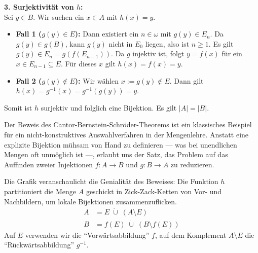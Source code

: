\begin{math-stroke}
\begin{short-proof}
\textbf{3. Surjektivität von $h$:} \\
Sei $y \in B$. Wir suchen ein $x \in A$ mit $h(x) = y$.
\begin{itemize}
    \item \textbf{Fall 1 ($g(y) \in E$):} Dann existiert ein $n \in \omega$ mit $g(y) \in E_n$. Da $g(y) \in g(B)$, kann $g(y)$ nicht in $E_0$ liegen, also ist $n \ge 1$. Es gilt $g(y) \in E_n = g(f(E_{n-1}))$. Da $g$ injektiv ist, folgt $y = f(x)$ für ein $x \in E_{n-1} \subseteq E$. Für dieses $x$ gilt $h(x) = f(x) = y$.
    \item \textbf{Fall 2 ($g(y) \notin E$):} Wir wählen $x := g(y) \notin E$. Dann gilt $h(x) = g^{-1}(x) = g^{-1}(g(y)) = y$.
\end{itemize}
Somit ist $h$ surjektiv und folglich eine Bijektion. Es gilt $|A| = |B|$.
\end{short-proof}
\end{math-stroke}

\begin{didactic-insight}
Der Beweis des Cantor-Bernstein-Schröder-Theorems ist ein klassisches Beispiel für ein nicht-konstruktives Auswahlverfahren in der Mengenlehre. Anstatt eine explizite Bijektion mühsam von Hand zu definieren --- was bei unendlichen Mengen oft unmöglich ist ---, erlaubt uns der Satz, das Problem auf das Auffinden zweier Injektionen $f \colon A \to B$ und $g \colon B \to A$ zu reduzieren. 

Die Grafik veranschaulicht die Genialität des Beweises: Die Funktion $h$ partitioniert die Menge $A$ geschickt in Zick-Zack-Ketten von Vor- und Nachbildern, um lokale Bijektionen zusammenzuflicken.
\begin{align*}
  A &= E \;\dot{\cup}\; (A \setminus E) \\
  B &= f(E) \;\dot{\cup}\; (B \setminus f(E))
\end{align*}
Auf $E$ verwenden wir die ``Vorwärtsabbildung'' $f$, auf dem Komplement $A \setminus E$ die ``Rückwärtsabbildung'' $g^{-1}$.
\end{didactic-insight}


\begin{math-stroke}
\end{math-stroke}

